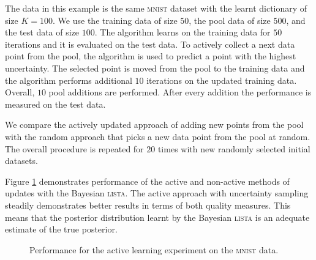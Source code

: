 \documentclass[letterpaper]{article}
\begin{document}
The data in this example is the same \textsc{mnist} dataset with the learnt dictionary of size $K=100$. We use the training data of size $50$, the pool data of size $500$,  and the test data of size $100$. The algorithm learns on the training data for $50$ iterations and it is evaluated on the test data. To actively collect a next data point from the pool, the algorithm is used to predict a point with the highest uncertainty. The selected point is moved from the pool to the training data and the algorithm performs additional $10$ iterations on the updated training data. Overall, $10$ pool additions are performed. After every addition the performance is measured on the test data.

We compare the actively updated approach of adding new points from the pool with the random approach that picks a new data point from the pool at random. The overall procedure is repeated for $20$ times with new randomly selected initial datasets.

Figure \ref{fig:active_learning_mnist} demonstrates performance of the active and non-active methods of updates with the Bayesian \textsc{lista}. The active approach with uncertainty sampling steadily demonstrates better results in terms of both quality measures. This means that the posterior distribution learnt by the Bayesian \textsc{lista} is an adequate estimate of the true posterior.
\begin{figure}[t]
\centering
{}%
\caption{Performance for the active learning experiment on the \textsc{mnist} data. }
\label{fig:active_learning_mnist}
\end{figure}
\end{document}
